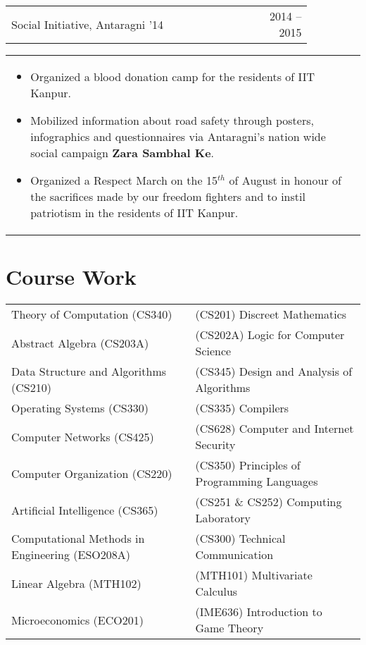 \documentclass[a4paper,10pt]{article} %
\newcommand{\iproject}[3]{
    \begin{tabular}{p{0.85\linewidth}r}
        \textcolor{NavyBlue}{#2} & \multicolumn{1}{m{3cm}}{\raggedleft \textsc{#1}}\\
    \end{tabular}
    \begin{tabular}{p{\linewidth}}
    \vspace{-0.3cm}
        \footnotesize{#3}
    \end{tabular}
    \vspace{-0.5cm}
}
\begin{document}
\iproject {2014 -- 2015}
          {Social Initiative, Antaragni '14}
          {
               \begin{itemize}[leftmargin=0.5cm]
                   \item Organized a blood donation camp for the residents of IIT Kanpur.
                   \item Mobilized information about road safety through posters, infographics and questionnaires
                       via Antaragni's nation wide social campaign \textbf{Zara Sambhal Ke}.
                   \item Organized a Respect March on the 15$^{th}$ of August in honour of the sacrifices made by our
                       freedom fighters and to instil patriotism in the residents of IIT Kanpur.
               \end{itemize}
          }


\section{Course Work}

\begin{center}
    \begin{tabular}{>{\raggedleft}p{8cm}|p{8cm}}

        Theory of Computation (CS340) & (CS201) Discreet Mathematics \\
        Abstract Algebra (CS203A) & (CS202A) Logic for Computer Science \\
        Data Structure and Algorithms (CS210) & (CS345) Design and Analysis of Algorithms \\
        Operating Systems (CS330) & (CS335) Compilers \\
        Computer Networks (CS425) &  (CS628) Computer and Internet Security \\
        Computer Organization (CS220) & (CS350) Principles of Programming Languages \\
        Artificial Intelligence (CS365) & (CS251 \& CS252) Computing Laboratory \\
        Computational Methods in Engineering (ESO208A) & (CS300) Technical Communication \\
        Linear Algebra (MTH102) &  (MTH101) Multivariate Calculus \\
        Microeconomics (ECO201) & (IME636) Introduction to Game Theory \\
    \end{tabular}
\end{center}
\end{document}
